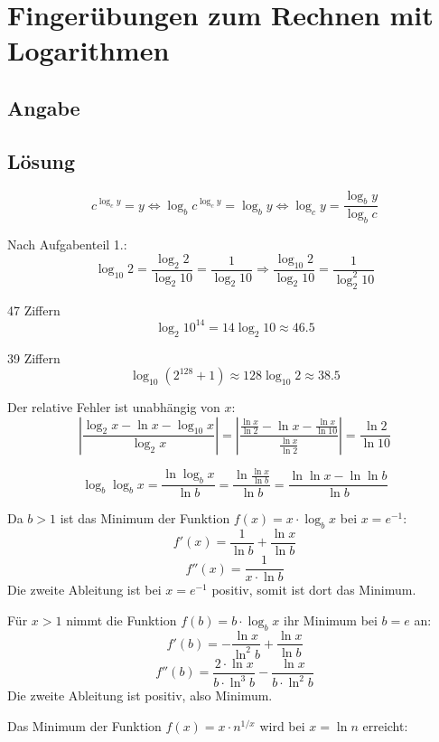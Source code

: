 \section*{Fingerübungen zum Rechnen mit Logarithmen}
\subsection*{Angabe}


\subsection*{Lösung}
\begin{flushenum}
\item
	\[ c^{\log_c y} = y \Leftrightarrow 
	\log_b c^{\log_c y} = \log_b y \Leftrightarrow \log_c y =
	\frac{\log_b y}{\log_b c}\]
\item Nach Aufgabenteil 1.:
	\[ \log_{10} 2 = \frac{\log_2 2}{\log_2 10} = \frac{1}{\log_2 10}
	\Rightarrow \frac{\log_{10} 2}{\log_2 10} = \frac{1}{\log_2^2 10} \]
\item 47 Ziffern \[ \log_2 10^{14} = 14 \log_2 10 \approx 46.5 \]
\item 39 Ziffern \[ \log_{10} (2^{128} + 1) \approx 128 \log_{10} 2 \approx 38.5 \]
\item Der relative Fehler ist unabhängig von $x$:
	\[ \left| \frac{\log_2 x - \ln x - \log_{10} x}{\log_2 x} \right| =
	\left| \frac{\frac{\ln x}{\ln 2} - \ln x - \frac{\ln x}{\ln
	10}}{\frac{\ln x}{\ln 2}} \right| = \frac{\ln 2}{\ln 10} \]
\item
	\[ \log_b \log_b x = \frac{\ln \log_b x}{\ln b} = \frac{\ln \frac{\ln
	x}{\ln b}}{\ln b} = \frac{\ln \ln x - \ln \ln b}{\ln b}\]
\item Da $b > 1$ ist das Minimum der Funktion $f(x) = x \cdot \log_b x$ bei $x = e^{-1}$:
	\[ f'(x) = \frac{1}{\ln b} + \frac{\ln x}{\ln b} \]
	\[ f''(x) = \frac{1}{x \cdot \ln b} \]
	Die zweite Ableitung ist bei $x = e^{-1}$ positiv, somit ist dort das Minimum.
\item Für $x > 1$ nimmt die Funktion $f(b) = b \cdot \log_b x$ ihr Minimum bei $b = e$ an:
	\[ f'(b) = -\frac{\ln x}{\ln^2 b} + \frac{\ln x}{\ln b} \]
	\[f''(b) = \frac{2 \cdot \ln x}{b \cdot \ln^3 b} - \frac{\ln x}{b \cdot \ln^2 b} \]
	Die zweite Ableitung ist positiv, also Minimum.
\item Das Minimum der Funktion $f(x) = x \cdot n^{1/x}$ wird bei $x = \ln n$ erreicht:

\end{flushenum}

